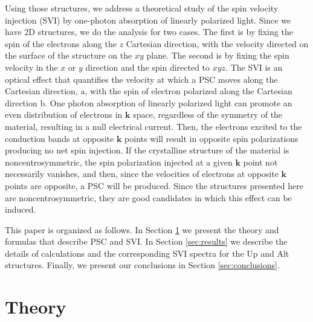 \documentclass[floatfix,prb,aps,superscriptaddress,showpacs,11pt,preprint,letterpaper]{revtex4}
\begin{document}
Using those structures, we address a theoretical study of the 
spin velocity
injection (SVI) 
by one-photon absorption of linearly polarized light.
Since we have 2D structures, we do the analysis for two cases. The first is by
fixing the spin of the electrons along the $z$ Cartesian direction, with the
velocity directed on the surface of the structure on the $xy$ plane. The second
is by fixing the spin velocity in the $x$ or $y$ direction and the spin directed
to $xyz$.
% 
The SVI is an optical effect that quantifies the velocity at which a PSC moves
along the Cartesian direction, $\mathrm{a}$, with the spin of electron polarized
along the Cartesian direction $\mathrm{b}$. One photon absorption of linearly
polarized light can promote an even distribution of electrons in $\mathbf{k}$ space,
regardless of the symmetry of the material, resulting in a 
null electrical current.\cite{bhatPRL05}
Then, the electrons excited to the conduction bands at opposite $\mathbf{k}$
points will result in opposite spin polarizations producing no net spin
injection.\cite{bhatPRL05} If the crystalline structure of the material is
noncentrosymmetric, the spin polarization injected at a given $\mathbf{k}$ point
not necessarily 
 vanishes,\cite{alvaradoPRL85, schmiedeskampPRL88} 
and then, since the velocities of electrons at opposite $\mathbf{k}$ points are
opposite, a PSC will be produced. Since the structures presented
here are noncentrosymmetric, they are good candidates in which this effect can
be induced.

This paper is organized as follows. In Section \ref{sec:theory} we present the
theory and formulas that describe PSC and SVI. In Section \ref{sec:results} we
describe the details of calculations and the corresponding SVI spectra for the
Up and Alt structures. Finally, we present our conclusions in
Section \ref{sec:conclusions}.



\section{Theory} %
\label{sec:theory}
\end{document}
